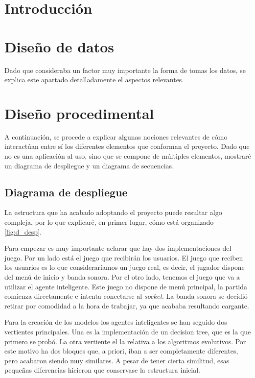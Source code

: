 
\section{Introducción}

\section{Diseño de datos}
Dado que consideraba un factor muy importante la forma de tomas los datos, se explica este apartado detalladamente el aspectos relevantes.


\section{Diseño procedimental}
A continuación, se procede a explicar algunas nociones relevantes de cómo interactúan entre sí los diferentes elementos que conforman el proyecto. Dado que no es una aplicación al uso, sino que se compone de múltiples elementos, mostraré un diagrama de despliegue y un diagrama de secuencias.

\subsection{Diagrama de despliegue}
La estructura que ha acabado adoptando el proyecto puede resultar algo compleja, por lo que explicaré, en primer lugar, cómo está organizado \ref{fig:d_desp}.

Para empezar es muy importante aclarar que hay dos implementaciones del juego. Por un lado está el juego que recibirán los usuarios. El juego que reciben los usuarios es lo que consideraríamos un juego real, es decir, el jugador dispone del menú de inicio y banda sonora. Por el otro lado, tenemos el juego que va a utilizar el agente inteligente. Este juego no dispone de menú principal, la partida comienza directamente e intenta conectarse al \emph{socket}. La banda sonora se decidió retirar por comodidad a la hora de trabajar, ya que acababa resultando cargante.

Para la creación de los modelos los agentes inteligentes se han seguido dos vertientes principales. Una es la implementación de un decision tree, que es la que primero se probó. La otra vertiente el la relativa a los algoritmos evolutivos. Por este motivo ha dos bloques que, a priori, iban a ser completamente diferentes, pero acabaron siendo muy similares. A pesar de tener cierta similitud, esas pequeñas diferencias hicieron que conservase la estructura inicial.


